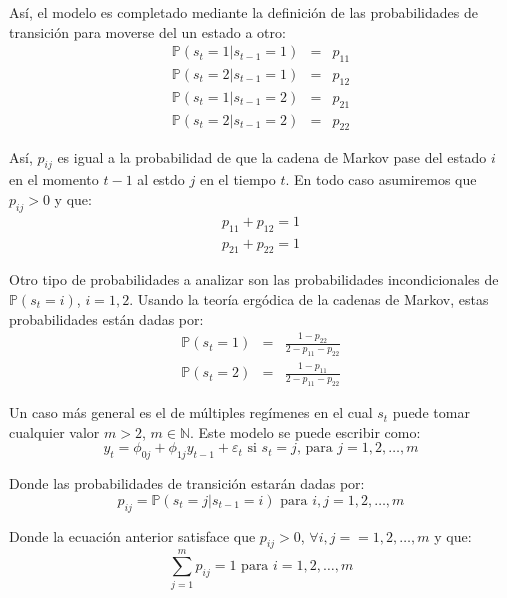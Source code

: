 \documentclass[
]{book}
\begin{document}
Así, el modelo es completado mediante la definición de las probabilidades de transición para moverse del un estado a otro:
\begin{eqnarray*}
    \mathbb{P}(s_t = 1 | s_{t-1} = 1) & = & p_{11} \\
    \mathbb{P}(s_t = 2 | s_{t-1} = 1) & = & p_{12} \\
    \mathbb{P}(s_t = 1 | s_{t-1} = 2) & = & p_{21} \\
    \mathbb{P}(s_t = 2 | s_{t-1} = 2) & = & p_{22} 
\end{eqnarray*}

Así, \(p_{ij}\) es igual a la probabilidad de que la cadena de Markov pase del estado \(i\) en el momento \(t-1\) al estdo \(j\) en el tiempo \(t\). En todo caso asumiremos que \(p_{ij} > 0\) y que:
\begin{eqnarray*}
    p_{11} + p_{12} = 1 \\
    p_{21} + p_{22} = 1 
\end{eqnarray*}

Otro tipo de probabilidades a analizar son las probabilidades incondicionales de \(\mathbb{P}(s_t = i)\), \(i = 1, 2\). Usando la teoría ergódica de la cadenas de Markov, estas probabilidades están dadas por:
\begin{eqnarray*}
    \mathbb{P}(s_t = 1) & = & \frac{1 - p_{22}}{2 - p_{11} - p_{22}} \\ 
    \mathbb{P}(s_t = 2) & = & \frac{1 - p_{11}}{2 - p_{11} - p_{22}}
\end{eqnarray*}

Un caso más general es el de múltiples regímenes en el cual \(s_t\) puede tomar cualquier valor \(m > 2\), \(m \in \mathbb{N}\). Este modelo se puede escribir como:
\begin{equation}
    y_t = \phi_{0j} + \phi_{1j} y_{t-1} + \varepsilon_t \text{ si } s_t = j \text{, para } j = 1, 2, \ldots, m
\end{equation}

Donde las probabilidades de transición estarán dadas por:
\begin{equation}
    p_{ij} = \mathbb{P}(s_t = j | s_{t-1} = i) \text{ para } i , j = 1, 2, \ldots, m
\end{equation}

Donde la ecuación anterior satisface que \(p_{ij} > 0\), \(\forall i, j = = 1, 2, \ldots, m\) y que:
\begin{equation*}
    \sum_{j=1}^m p_{ij} = 1 \text{ para } i = 1, 2, \ldots, m
\end{equation*}
\end{document}
